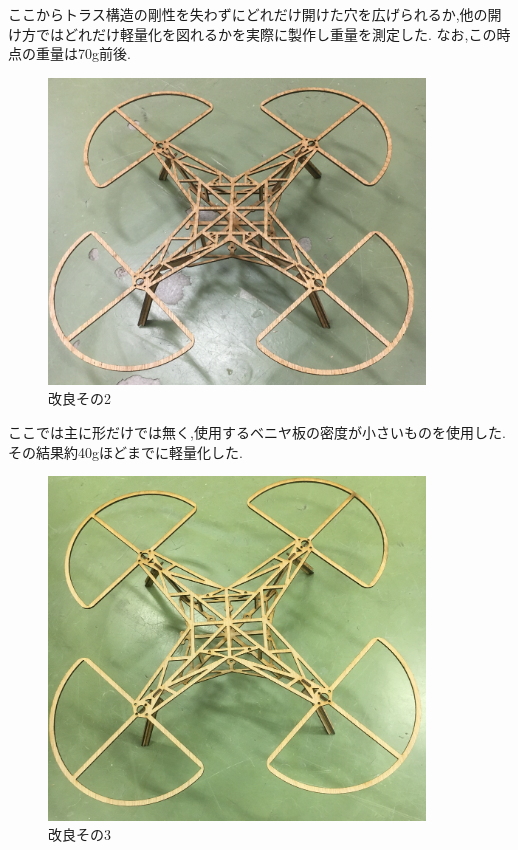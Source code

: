 \documentclass[12pt,oneside]{paper}
\begin{document}
ここからトラス構造の剛性を失わずにどれだけ開けた穴を広げられるか,他の開け方ではどれだけ軽量化を図れるかを実際に製作し重量を測定した.
なお,この時点の重量は70g前後.

\begin{figure}[H]
  \begin{center}
    \includegraphics[width=100mm]{ga/thr.jpg}
    \end{center}
  \caption{改良その2}
 \label{fig:thr}
\end{figure}

ここでは主に形だけでは無く,使用するベニヤ板の密度が小さいものを使用した.その結果約40gほどまでに軽量化した.

\begin{figure}[H]
  \begin{center}
    \includegraphics[width=100mm]{ga/fif.jpg}
    \end{center}
  \caption{改良その3}
 \label{fig:fif}
\end{figure}
\end{document}
